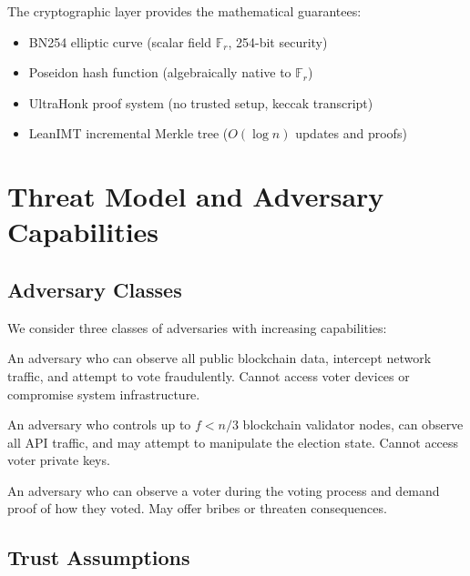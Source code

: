 The cryptographic layer provides the mathematical guarantees:
\begin{itemize}
    \item BN254 elliptic curve (scalar field $\mathbb{F}_r$, 254-bit security)
    \item Poseidon hash function (algebraically native to $\mathbb{F}_r$)
    \item UltraHonk proof system (no trusted setup, keccak transcript)
    \item LeanIMT incremental Merkle tree ($O(\log n)$ updates and proofs)
\end{itemize}

\section{Threat Model and Adversary Capabilities}

\subsection{Adversary Classes}

We consider three classes of adversaries with increasing capabilities:

\begin{definition}
An adversary who can observe all public blockchain data, intercept network traffic, and attempt to vote fraudulently. Cannot access voter devices or compromise system infrastructure.
\end{definition}

\begin{definition}
An adversary who controls up to $f < n/3$ blockchain validator nodes, can observe all API traffic, and may attempt to manipulate the election state. Cannot access voter private keys.
\end{definition}

\begin{definition}
An adversary who can observe a voter during the voting process and demand proof of how they voted. May offer bribes or threaten consequences.
\end{definition}

\subsection{Trust Assumptions}

